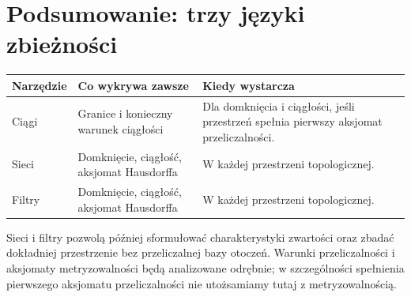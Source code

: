 \section{Podsumowanie: trzy języki zbieżności}
\label{sec:topog-zbieznosc-zestawienie}

\begin{center}
\begin{tabular}{@{}p{}p{}p{}@{}}
\hline
\textbf{Narzędzie} & \textbf{Co wykrywa zawsze} &
\textbf{Kiedy wystarcza}\ \\ \hline
Ciągi & Granice i konieczny warunek ciągłości &
Dla domknięcia i ciągłości, jeśli przestrzeń
spełnia pierwszy aksjomat przeliczalności.\\
Sieci & Domknięcie, ciągłość, aksjomat Hausdorffa &
W każdej przestrzeni topologicznej.\\
Filtry & Domknięcie, ciągłość, aksjomat Hausdorffa &
W każdej przestrzeni topologicznej.\\
\hline
\end{tabular}
\end{center}

\begin{uwaga}
\label{rem:topog-zbieznosc-dalsze}
Sieci i filtry pozwolą później sformułować
charakterystyki zwartości oraz zbadać dokładniej
przestrzenie bez przeliczalnej bazy otoczeń.
Warunki przeliczalności i aksjomaty metryzowalności
będą analizowane odrębnie; w szczególności
spełnienia pierwszego aksjomatu przeliczalności nie
utożsamiamy tutaj z metryzowalnością.
\end{uwaga}
